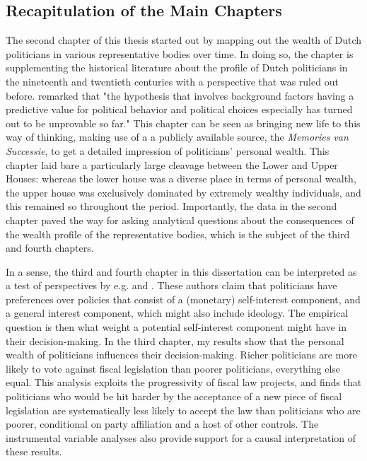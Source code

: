 \subsection{Recapitulation of the Main Chapters}\label{sec:recap}
The second chapter of this thesis started out by mapping out the wealth of Dutch politicians in various representative bodies over time. In doing so, the chapter is supplementing the historical literature about the profile of Dutch politicians in the nineteenth and twentieth centuries \citep{van1983toegang, secker1991ministers, van1999eerste, oomen2020werk} with a perspective that was ruled out before. \cite{van1983toegang} remarked that "the hypothesis that involves background factors having a predictive value for political behavior and political choices especially has turned out to be unprovable so far." This chapter can be seen as bringing new life to this way of thinking, making use of a a publicly available source, the \textit{Memories van Successie}, to get a detailed impression of politicians' personal wealth. This chapter laid bare a particularly large cleavage between the Lower and Upper Houses: whereas the lower house was a diverse place in terms of personal wealth, the upper house was exclusively dominated by extremely wealthy individuals, and this remained so throughout the period. Importantly, the data in the second chapter paved the way for asking analytical questions about the consequences of the wealth profile of the representative bodies, which is the subject of the third and fourth chapters. 

In a sense, the third and fourth chapter in this dissertation can be interpreted as a test of perspectives by e.g. \cite{tahoun2019personal} and \cite{grossman1996electoral}. These authors claim that politicians have preferences over policies that consist of a (monetary) self-interest component, and a general interest component, which might also include ideology. The empirical question is then what weight a potential self-interest component might have in their decision-making. In the third chapter, my results show that the personal wealth of politicians influences their decision-making. Richer politicians are more likely to vote against fiscal legislation than poorer politicians, everything else equal. This analysis exploits the progressivity of fiscal law projects, and finds that politicians who would be hit harder by the acceptance of a new piece of fiscal legislation are systematically less likely to accept the law than politicians who are poorer, conditional on party affiliation and a host of other controls. The instrumental variable analyses also provide support for a causal interpretation of these results. 


